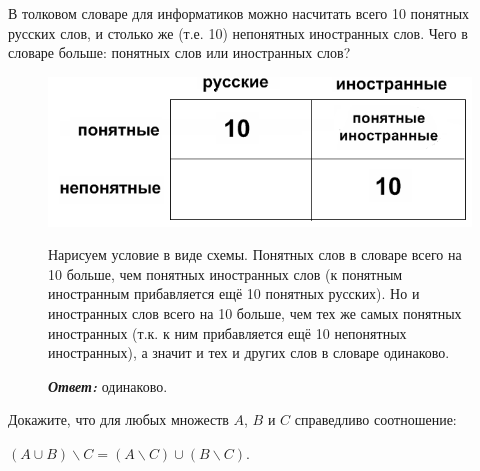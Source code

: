 \begin{thm}
В толковом словаре для информатиков можно насчитать всего 10 понятных русских слов, и столько же (т.е. 10) непонятных иностранных слов. Чего в словаре больше: понятных слов или иностранных слов?
\end{thm}
{\setlength{\intextsep}{2pt}
\begin{figure}[H]
\begin{minipage}{0.45\linewidth}
    \includegraphics[width=0.95\columnwidth]{./img/shema_slova}
\end{minipage}
\hfill
\begin{minipage}{0.54\linewidth}\setlength{\parindent}{1.5em}
    \begin{prf} Нарисуем условие в виде схемы. Понятных слов в словаре всего на 10 больше, чем понятных иностранных слов (к понятным иностранным прибавляется ещё 10 понятных русских). Но и иностранных слов всего на 10 больше, чем тех же самых понятных иностранных (т.к. к ним прибавляется ещё 10 непонятных иностранных), а значит и тех и других слов в словаре одинаково.
    \par
    \textbf{\textit{Ответ:}} одинаково.
    \end{prf}
\end{minipage}
\end{figure}}

\begin{thm}
Докажите, что для любых множеств $A$, $B$ и $C$ справедливо соотношение:
\par $(A \cup B) \backslash C = (A \backslash C) \cup (B \backslash C)$.
\end{thm}

